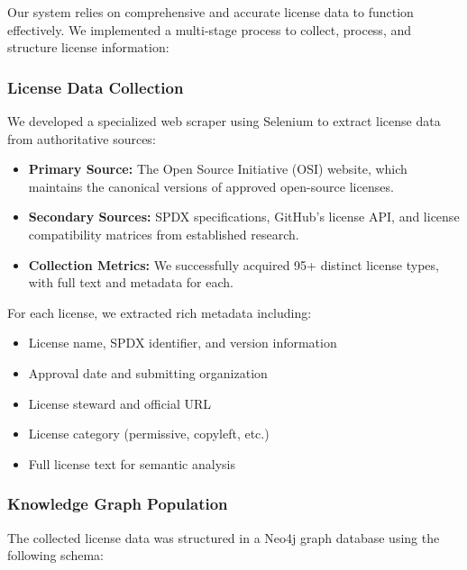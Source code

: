 \documentclass[12pt]{article}
\begin{document}
Our system relies on comprehensive and accurate license data to function effectively. We implemented a multi-stage process to collect, process, and structure license information:

\subsubsection{License Data Collection}
We developed a specialized web scraper using Selenium to extract license data from authoritative sources:

\begin{itemize}
    \item \textbf{Primary Source:} The Open Source Initiative (OSI) website, which maintains the canonical versions of approved open-source licenses.
    \item \textbf{Secondary Sources:} SPDX specifications, GitHub's license API, and license compatibility matrices from established research.
    \item \textbf{Collection Metrics:} We successfully acquired 95+ distinct license types, with full text and metadata for each.
\end{itemize}

For each license, we extracted rich metadata including:
\begin{itemize}
    \item License name, SPDX identifier, and version information
    \item Approval date and submitting organization
    \item License steward and official URL
    \item License category (permissive, copyleft, etc.)
    \item Full license text for semantic analysis
\end{itemize}

\subsubsection{Knowledge Graph Population}
The collected license data was structured in a Neo4j graph database using the following schema:
\end{document}
